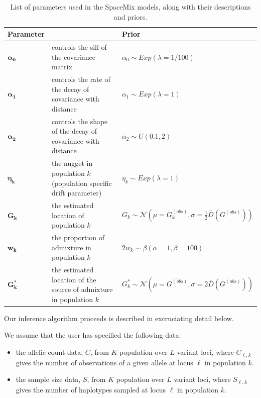\documentclass[12pt]{article}
\newcommand{\identifyadmixsource}[1]{{#1^{*}}}
\begin{document}
\begin{centering}
\begin{table}
\begin{tabular}{| >{\centering\arraybackslash}m{2.0cm} | m{5.2cm} | >{\centering\arraybackslash}m{6.8cm} |}
	\hline
	\textbf{Parameter} & \centering{\textbf{Description}} & \textbf{Prior}\\ \hline
	$\boldsymbol{\alpha_0}$ & 
		controls the sill of the covariance matrix & 
		$\alpha_0 \sim Exp(\lambda = 1/100)$\\ \hline
	$\boldsymbol{\alpha_1}$ & 
		controls the rate of the decay of covariance with distance & 
		$\alpha_1 \sim Exp(\lambda = 1)$\\ \hline
	$\boldsymbol{\alpha_2}$ & 
		controls the shape of the decay of covariance with distance & 
		$\alpha_2 \sim U(0.1,2)$\\ \hline
	$\boldsymbol{\eta_k}$ & 
		the nugget in population $k$ (population specific drift parameter)  & 
		$\eta_k \sim Exp(\lambda = 1)$\\ \hline
	$\boldsymbol{G_k}$ & 
		the estimated location of population $k$ &
		 $G_k \sim \mathcal{N}(\mu = G^{(obs)}_k,\sigma = \frac{1}{2}\bar{D}(G^{(obs)}))$ \\ \hline
	$\boldsymbol{w_k}$ &
		the proportion of admixture in population $k$ &
		$2 w_k \sim \beta(\alpha = 1,\beta = 100)$  \\ \hline
	$\boldsymbol{\identifyadmixsource{G_k}}$ &
		the estimated location of the source of admixture in population $k$ &
		$\identifyadmixsource{G_k} \sim \mathcal{N}(\mu = \bar{G^{(obs)}},\sigma = 2 \bar{D}(G^{(obs)}))$ \\
	\hline
\end{tabular}
\caption{List of parameters used in the SpaceMix models, along with their descriptions and priors.}\label{tab:param_prior_tab}
\end{table}
\end{centering}

Our inference algorithm proceeds is described in excruciating detail below.

We assume that the user has specified the following data: 
\begin{itemize}
\item the allelic count data, $C$, from $K$ population over $L$ variant loci, where $C_{\ell,k}$ gives the number of observations of a given allele at locus $\ell$ in population $k$. 
\item the sample size data, $S$, from $K$ population over $L$ variant loci, where $S_{\ell,k}$ gives the number of haplotypes sampled at locus $\ell$ in population $k$.
\end{itemize}
\end{document}
